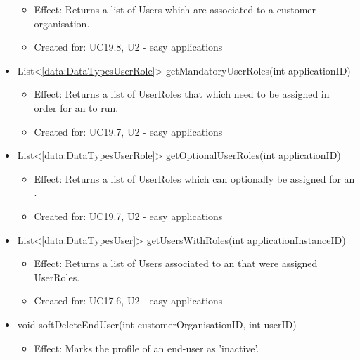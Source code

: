 \begin{description}
\begin{itemize}[noitemsep,nolistsep,leftmargin=-.25cm]
        \begin{itemize}[noitemsep,nolistsep]
           \item Effect: Returns a list of Users which are associated to a customer organisation.
\item Created for: UC19.8, U2 - easy applications
        \end{itemize}
      \item \textsf{List\textless{}\ref{data:DataTypesUserRole}\textgreater{} getMandatoryUserRoles(int applicationID)}
        \begin{itemize}[noitemsep,nolistsep]
           \item Effect: Returns a list of UserRoles that which need to be assigned in order for an  to run.
\item Created for: UC19.7, U2 - easy applications
        \end{itemize}
      \item \textsf{List\textless{}\ref{data:DataTypesUserRole}\textgreater{} getOptionalUserRoles(int applicationID)}
        \begin{itemize}[noitemsep,nolistsep]
           \item Effect: Returns a list of UserRoles which can optionally be assigned for an .
\item Created for: UC19.7, U2 - easy applications
        \end{itemize}
      \item \textsf{List\textless{}\ref{data:DataTypesUser}\textgreater{} getUsersWithRoles(int applicationInstanceID)}
        \begin{itemize}[noitemsep,nolistsep]
           \item Effect: Returns a list of Users associated to an  that were assigned UserRoles.
\item Created for: UC17.6, U2 - easy applications
        \end{itemize}
      \item \textsf{void softDeleteEndUser(int customerOrganisationID, int userID)}
        \begin{itemize}[noitemsep,nolistsep]
           \item Effect: Marks the profile of an end-user as 'inactive'.

\end{itemize}
\end{itemize}
\end{description}
